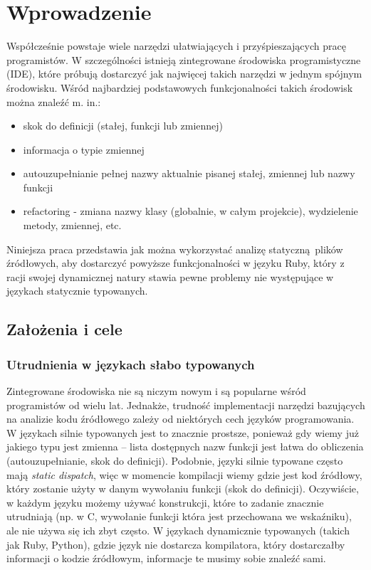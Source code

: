 \documentclass[declaration,shortabstract]{iithesis}
\author         {Rafał Łasocha}
\begin{document}
\chapter{Wprowadzenie}

Współcześnie powstaje wiele narzędzi ułatwiających i przyśpieszających pracę programistów.
W szczególności istnieją zintegrowane środowiska programistyczne (IDE), które próbują dostarczyć jak najwięcej takich narzędzi w jednym spójnym środowisku. Wśród najbardziej podstawowych funkcjonalności takich środowisk można znaleźć m. in.:

\begin{itemize}
\item skok do definicji (stałej, funkcji lub zmiennej)
\item informacja o typie zmiennej
\item autouzupełnianie pełnej nazwy aktualnie pisanej stałej, zmiennej lub nazwy funkcji
\item refactoring - zmiana nazwy klasy (globalnie, w całym projekcie), wydzielenie metody, zmiennej, etc.
\end{itemize}

Niniejsza praca przedstawia jak można wykorzystać analizę statyczną plików źródłowych, aby dostarczyć powyższe funkcjonalności w języku Ruby, który z racji swojej dynamicznej natury stawia pewne problemy nie występujące w językach statycznie typowanych.

\section{Założenia i cele}

\subsection{Utrudnienia w językach słabo typowanych}

Zintegrowane środowiska nie są niczym nowym i są popularne wśród programistów od wielu lat.
Jednakże, trudność implementacji narzędzi bazujących na analizie kodu źródłowego zależy od niektórych cech języków programowania.
W językach silnie typowanych jest to znacznie prostsze, ponieważ gdy wiemy już jakiego typu jest zmienna -- lista dostępnych nazw funkcji jest łatwa do obliczenia (autouzupełnianie, skok do definicji). 
Podobnie, języki silnie typowane często mają \textit{static dispatch}, więc w momencie kompilacji wiemy gdzie jest kod źródłowy, który zostanie użyty w danym wywołaniu funkcji (skok do definicji).
Oczywiście, w każdym języku możemy używać konstrukcji, które to zadanie znacznie utrudniają (np. w C, wywołanie funkcji która jest przechowana we wskaźniku), ale nie używa się ich zbyt często.
W językach dynamicznie typowanych (takich jak Ruby, Python), gdzie język nie dostarcza kompilatora, który dostarczałby informacji o kodzie źródłowym, informacje te musimy sobie znaleźć sami.
\end{document}
